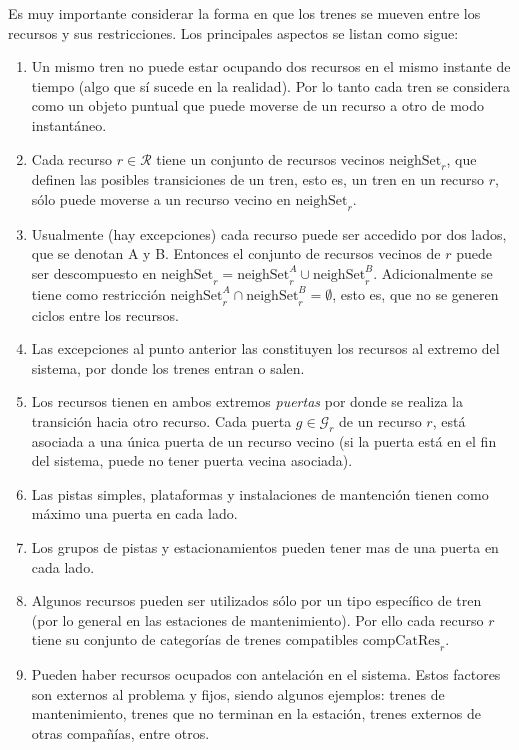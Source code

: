 \documentclass[letter, 10pt]{article}
\begin{document}
\begin{description}
    Es muy importante considerar la forma en que los trenes se mueven entre los recursos y sus restricciones. Los principales aspectos se listan como sigue:
    \begin{enumerate}
        \item Un mismo tren no puede estar ocupando dos recursos en el mismo instante de tiempo (algo que sí sucede en la realidad). Por lo tanto cada tren se considera como un objeto puntual que puede moverse de un recurso a otro de modo instantáneo.
        \item Cada recurso $r \in \mathcal{R}$ tiene un conjunto de recursos vecinos $\text{neighSet}_r$, que definen las posibles transiciones de un tren, esto es, un tren en un recurso $r$, sólo puede moverse a un recurso vecino en $\text{neighSet}_r$.
        \item Usualmente (hay excepciones) cada recurso puede ser accedido por dos lados, que se denotan A y B. Entonces el conjunto de recursos vecinos de $r$ puede ser descompuesto en $\text{neighSet}_r = \text{neighSet}_r^A \cup \text{neighSet}_r^B$. Adicionalmente se tiene como restricción $\text{neighSet}_r^A \cap \text{neighSet}_r^B = \emptyset$, esto es, que no se generen ciclos entre los recursos.
        \item Las excepciones al punto anterior las constituyen los recursos al extremo del sistema, por donde los trenes entran o salen.
        \item Los recursos tienen en ambos extremos \textit{puertas} por donde se realiza la transición hacia otro recurso.
        Cada puerta $g \in \mathcal{G}_r$ de un recurso $r$, está asociada a una única puerta de un recurso vecino (si la puerta está en el fin del sistema, puede no tener puerta vecina asociada).
        \item Las pistas simples, plataformas y instalaciones de mantención tienen como máximo una puerta en cada lado.
        \item Los grupos de pistas y estacionamientos pueden tener mas de una puerta en cada lado.
        \item Algunos recursos pueden ser utilizados sólo por un tipo específico de tren (por lo general en las estaciones de mantenimiento). Por ello cada recurso $r$ tiene su conjunto de categorías de trenes compatibles $\text{compCatRes}_r$.
        \item Pueden haber recursos ocupados con antelación en el sistema. Estos factores son externos al problema y fijos, siendo algunos ejemplos: trenes de mantenimiento, trenes que no terminan en la estación, trenes externos de otras compañías, entre otros.
    \end{enumerate}


\end{description}
\end{document}
